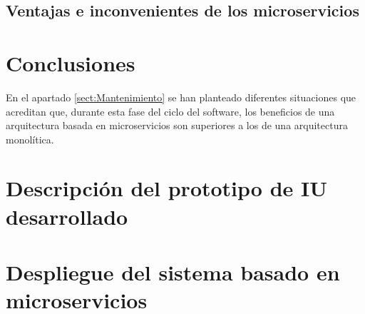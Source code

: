 \documentclass[11pt,spanish,listoffigures]{tfgetsinf}
\begin{document}
\section{Ventajas e inconvenientes de los microservicios}


\chapter{Conclusiones} \label{ch:Conclusiones}

En el apartado \ref{sect:Mantenimiento}  se han planteado diferentes situaciones que acreditan que, durante esta fase del ciclo del software, los beneficios de una arquitectura basada en microservicios son superiores a los de una arquitectura monolítica.







\APPENDIX

%

\chapter{Descripción del prototipo de IU desarrollado} \label{ch:ModeloNavegacion}

%
\chapter{Despliegue del sistema basado en microservicios} \label{chap:Despliegue}
\end{document}
